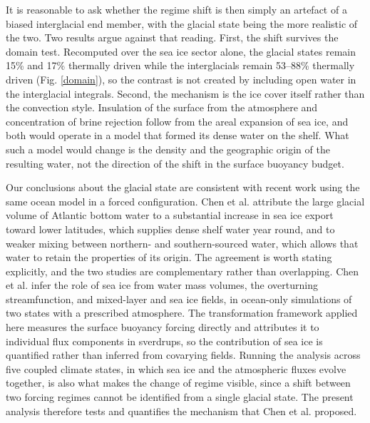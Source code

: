 \documentclass[pdflatex,sn-nature]{sn-jnl}
\begin{document}
It is reasonable to ask whether the regime shift is then simply an artefact of a biased interglacial end member, with the glacial state being the more realistic of the two. Two results argue against that reading. First, the shift survives the domain test. Recomputed over the sea ice sector alone, the glacial states remain 15\% and 17\% thermally driven while the interglacials remain 53--88\% thermally driven (Fig. \ref{domain}), so the contrast is not created by including open water in the interglacial integrals. Second, the mechanism is the ice cover itself rather than the convection style. Insulation of the surface from the atmosphere and concentration of brine rejection follow from the areal expansion of sea ice, and both would operate in a model that formed its dense water on the shelf. What such a model would change is the density and the geographic origin of the resulting water, not the direction of the shift in the surface buoyancy budget.

Our conclusions about the glacial state are consistent with recent work using the same ocean model in a forced configuration. Chen et al. \cite{Chen2025} attribute the large glacial volume of Atlantic bottom water to a substantial increase in sea ice export toward lower latitudes, which supplies dense shelf water year round, and to weaker mixing between northern- and southern-sourced water, which allows that water to retain the properties of its origin. The agreement is worth stating explicitly, and the two studies are complementary rather than overlapping. Chen et al. infer the role of sea ice from water mass volumes, the overturning streamfunction, and mixed-layer and sea ice fields, in ocean-only simulations of two states with a prescribed atmosphere. The transformation framework applied here measures the surface buoyancy forcing directly and attributes it to individual flux components in sverdrups, so the contribution of sea ice is quantified rather than inferred from covarying fields. Running the analysis across five coupled climate states, in which sea ice and the atmospheric fluxes evolve together, is also what makes the change of regime visible, since a shift between two forcing regimes cannot be identified from a single glacial state. The present analysis therefore tests and quantifies the mechanism that Chen et al. proposed.
\end{document}
